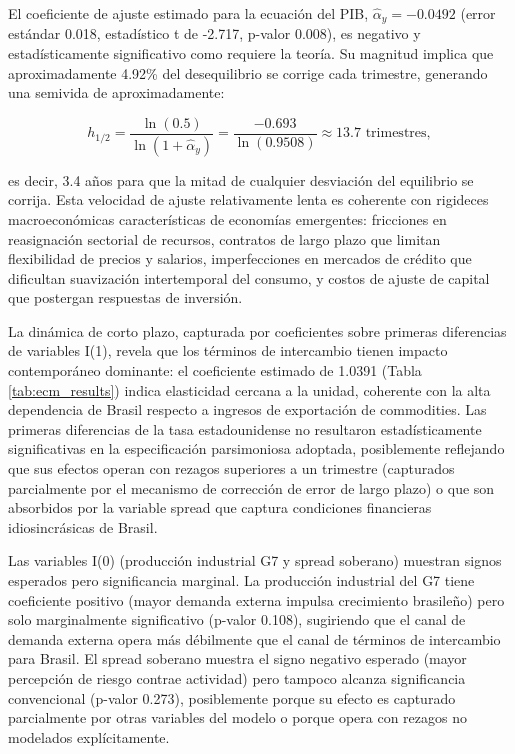 \documentclass[3p,11pt,draft,natbib=false]{elsarticle}
\begin{document}
El coeficiente de ajuste estimado para la ecuación del PIB, $\hat{\alpha}_y = -0.0492$ (error estándar 0.018, estadístico t de -2.717, p-valor 0.008), es negativo y estadísticamente significativo como requiere la teoría. Su magnitud implica que aproximadamente 4.92\% del desequilibrio se corrige cada trimestre, generando una semivida de aproximadamente:

\begin{equation}
h_{1/2} = \frac{\ln(0.5)}{\ln(1 + \hat{\alpha}_y)} = \frac{-0.693}{\ln(0.9508)} \approx 13.7 \text{ trimestres},
\label{eq:half_life}
\end{equation}

es decir, 3.4 años para que la mitad de cualquier desviación del equilibrio se corrija. Esta velocidad de ajuste relativamente lenta es coherente con rigideces macroeconómicas características de economías emergentes: fricciones en reasignación sectorial de recursos, contratos de largo plazo que limitan flexibilidad de precios y salarios, imperfecciones en mercados de crédito que dificultan suavización intertemporal del consumo, y costos de ajuste de capital que postergan respuestas de inversión.

La dinámica de corto plazo, capturada por coeficientes sobre primeras diferencias de variables I(1), revela que los términos de intercambio tienen impacto contemporáneo dominante: el coeficiente estimado de 1.0391 (Tabla \ref{tab:ecm_results}) indica elasticidad cercana a la unidad, coherente con la alta dependencia de Brasil respecto a ingresos de exportación de commodities. Las primeras diferencias de la tasa estadounidense no resultaron estadísticamente significativas en la especificación parsimoniosa adoptada, posiblemente reflejando que sus efectos operan con rezagos superiores a un trimestre (capturados parcialmente por el mecanismo de corrección de error de largo plazo) o que son absorbidos por la variable spread que captura condiciones financieras idiosincrásicas de Brasil.

Las variables I(0) (producción industrial G7 y spread soberano) muestran signos esperados pero significancia marginal. La producción industrial del G7 tiene coeficiente positivo (mayor demanda externa impulsa crecimiento brasileño) pero solo marginalmente significativo (p-valor 0.108), sugiriendo que el canal de demanda externa opera más débilmente que el canal de términos de intercambio para Brasil. El spread soberano muestra el signo negativo esperado (mayor percepción de riesgo contrae actividad) pero tampoco alcanza significancia convencional (p-valor 0.273), posiblemente porque su efecto es capturado parcialmente por otras variables del modelo o porque opera con rezagos no modelados explícitamente.
\end{document}
